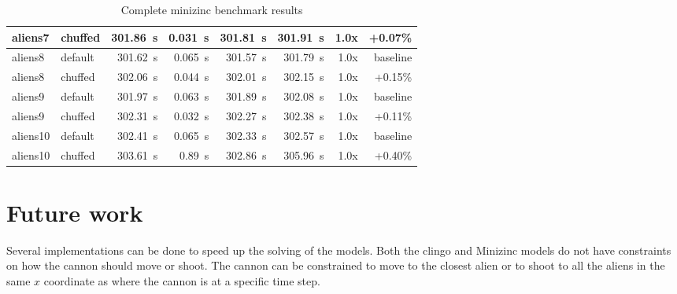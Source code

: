 \documentclass[11pt]{article}
\begin{document}
\begin{table}[h]
\begin{tabular}{|llrrrrrr|}
    aliens7 & chuffed & 301.86~s & 0.031~s & 301.81~s & 301.91~s & 1.0x & +0.07\% \\
    \hline
    aliens8 & default & 301.62~s & 0.065~s & 301.57~s & 301.79~s & 1.0x & baseline \\
    aliens8 & chuffed & 302.06~s & 0.044~s & 302.01~s & 302.15~s & 1.0x & +0.15\% \\
    \hline
    aliens9 & default & 301.97~s & 0.063~s & 301.89~s & 302.08~s & 1.0x & baseline \\
    aliens9 & chuffed & 302.31~s & 0.032~s & 302.27~s & 302.38~s & 1.0x & +0.11\% \\
    \hline
    aliens10 & default & 302.41~s & 0.065~s & 302.33~s & 302.57~s & 1.0x & baseline \\
    aliens10 & chuffed & 303.61~s & 0.89~s & 302.86~s & 305.96~s & 1.0x & +0.40\% \\

    \hline
  \end{tabular}
  \caption{Complete minizinc benchmark results}
  \label{table:minizinc-bench-comparative}
\end{table}

\section{Future work}
Several implementations can be done to speed up the solving of the models.
Both the clingo and Minizinc models do not have constraints on how the cannon should move or shoot.
The cannon can be constrained to move to the closest alien or to shoot to all the aliens in the same $x$ coordinate as where the cannon is at a specific time step.


\printbibliography
\end{document}
